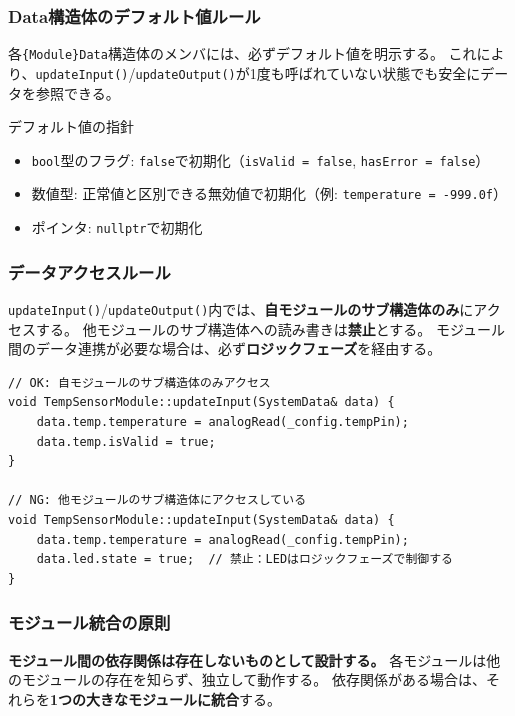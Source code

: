 \subsubsection{Data構造体のデフォルト値ルール}

各\texttt{\{Module\}Data}構造体のメンバには、必ずデフォルト値を明示する。
これにより、\texttt{updateInput()}/\texttt{updateOutput()}が1度も呼ばれていない状態でも安全にデータを参照できる。

\begin{funcblock}{デフォルト値の指針}
\begin{itemize}
    \item \texttt{bool}型のフラグ: \texttt{false}で初期化（\texttt{isValid = false}, \texttt{hasError = false}）
    \item 数値型: 正常値と区別できる無効値で初期化（例: \texttt{temperature = -999.0f}）
    \item ポインタ: \texttt{nullptr}で初期化
\end{itemize}
\end{funcblock}

\subsubsection{データアクセスルール}

\texttt{updateInput()}/\texttt{updateOutput()}内では、\textbf{自モジュールのサブ構造体のみ}にアクセスする。
他モジュールのサブ構造体への読み書きは\textbf{禁止}とする。
モジュール間のデータ連携が必要な場合は、必ず\textbf{ロジックフェーズ}を経由する。

\begin{lstlisting}[style=cppstyle, caption={データアクセスルールの例}]
// OK: 自モジュールのサブ構造体のみアクセス
void TempSensorModule::updateInput(SystemData& data) {
    data.temp.temperature = analogRead(_config.tempPin);
    data.temp.isValid = true;
}

// NG: 他モジュールのサブ構造体にアクセスしている
void TempSensorModule::updateInput(SystemData& data) {
    data.temp.temperature = analogRead(_config.tempPin);
    data.led.state = true;  // 禁止：LEDはロジックフェーズで制御する
}
\end{lstlisting}

\subsubsection{モジュール統合の原則}

\textbf{モジュール間の依存関係は存在しないものとして設計する。}
各モジュールは他のモジュールの存在を知らず、独立して動作する。
依存関係がある場合は、それらを\textbf{1つの大きなモジュールに統合}する。

